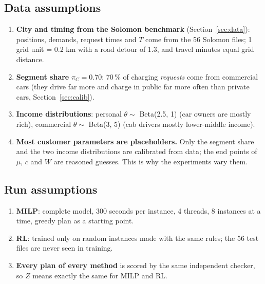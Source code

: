 \subsection{Data assumptions}
\begin{enumerate}[leftmargin=*,resume]
  \item \textbf{City and timing from the Solomon benchmark} (Section~\ref{sec:data}): positions, demands, request times and $T$ come from the 56 Solomon files; 1 grid unit = 0.2 km with a road detour of 1.3, and travel minutes equal grid distance.
  \item \textbf{Segment share} $\pi_C=0.70$: 70\,\% of charging \emph{requests} come from commercial cars (they drive far more and charge in public far more often than private cars, Section~\ref{sec:calib}).
  \item \textbf{Income distributions}: personal $\theta\sim$ Beta(2.5, 1) (car owners are mostly rich), commercial $\theta\sim$ Beta(3, 5) (cab drivers mostly lower-middle income).
  \item \textbf{Most customer parameters are placeholders.} Only the segment share and the two income distributions are calibrated from data; the end points of $\mu$, $c$ and $W$ are reasoned guesses. This is why the experiments vary them.
\end{enumerate}

\subsection{Run assumptions}
\begin{enumerate}[leftmargin=*,resume]
  \item \textbf{MILP}: complete model, 300 seconds per instance, 4 threads, 8 instances at a time, greedy plan as a starting point.
  \item \textbf{RL}: trained only on random instances made with the same rules; the 56 test files are never seen in training.
  \item \textbf{Every plan of every method} is scored by the same independent checker, so $Z$ means exactly the same for MILP and RL.
\end{enumerate}

